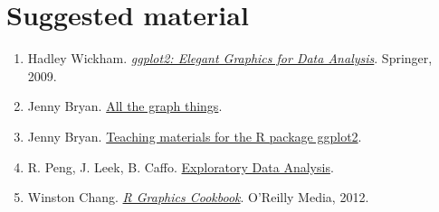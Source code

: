 \documentclass[11pt, oneside]{report}
\begin{document}












\chapter*{Suggested material}
%

\begin{enumerate}[(1)]
\item Hadley Wickham. \href{http://www.amazon.com/ggplot2-Elegant-Graphics-Data-Analysis/dp/0387981403/ref=sr_1_2?ie=UTF8&qid=1461133380&sr=8-2&keywords=ggplot2}{\emph{ggplot2: Elegant Graphics for Data Analysis}}. Springer, 2009.
\item Jenny Bryan. \href{http://stat545.com/graph00_index.html}{All the graph things}.
\item Jenny Bryan. \href{https://github.com/jennybc/ggplot2-tutorial}{Teaching materials for the R package ggplot2}.
\item R. Peng, J. Leek, B. Caffo. \href{https://www.coursera.org/learn/exploratory-data-analysis/}{Exploratory Data Analysis}.
\item Winston Chang. \href{http://www.amazon.com/R-Graphics-Cookbook-Winston-Chang/dp/1449316956/ref=sr_1_3?ie=UTF8&qid=1461135767&sr=8-3&keywords=ggplot2}{\emph{R Graphics Cookbook}}. O'Reilly Media, 2012.
\end{enumerate}

%
%

\newpage

\thispagestyle{empty}
\pagecolor{Olive}\afterpage{\nopagecolor}

\null
\vfill
\end{document}
